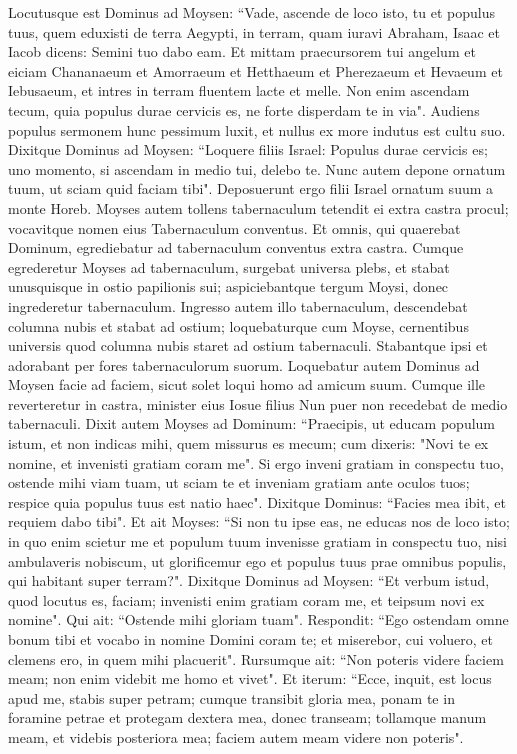 \begin{biblechapter}  
\verse Locutusque est Dominus ad Moysen: “Vade, ascende de loco isto, tu et populus tuus, quem eduxisti de terra Aegypti, in terram, quam iuravi Abraham, Isaac et Iacob dicens: Semini tuo dabo eam. 
\verse Et mittam praecursorem tui angelum et eiciam Chananaeum et Amorraeum et Hetthaeum et Pherezaeum et Hevaeum et Iebusaeum, 
\verse et intres in terram fluentem lacte et melle. Non enim ascendam tecum, quia populus durae cervicis es, ne forte disperdam te in via".  
\verse Audiens populus sermonem hunc pessimum luxit, et nullus ex more indutus est cultu suo. 
\verse Dixitque Dominus ad Moysen: “Loquere filiis Israel: Populus durae cervicis es; uno momento, si ascendam in medio tui, delebo te. Nunc autem depone ornatum tuum, ut sciam quid faciam tibi". 
\verse Deposuerunt ergo filii Israel ornatum suum a monte Horeb. 
\verse Moyses autem tollens tabernaculum tetendit ei extra castra procul; vocavitque nomen eius Tabernaculum conventus. Et omnis, qui quaerebat Dominum, egrediebatur ad tabernaculum conventus extra castra. 
\verse Cumque egrederetur Moyses ad tabernaculum, surgebat universa plebs, et stabat unusquisque in ostio papilionis sui; aspiciebantque tergum Moysi, donec ingrederetur tabernaculum. 
\verse Ingresso autem illo tabernaculum, descendebat columna nubis et stabat ad ostium; loquebaturque cum Moyse, 
\verse cernentibus universis quod columna nubis staret ad ostium tabernaculi. Stabantque ipsi et adorabant per fores tabernaculorum suorum. 
\verse Loquebatur autem Dominus ad Moysen facie ad faciem, sicut solet loqui homo ad amicum suum. Cumque ille reverteretur in castra, minister eius Iosue filius Nun puer non recedebat de medio tabernaculi. 
\verse Dixit autem Moyses ad Dominum: “Praecipis, ut educam populum istum, et non indicas mihi, quem missurus es mecum; cum dixeris: "Novi te ex nomine, et invenisti gratiam coram me". 
\verse Si ergo inveni gratiam in conspectu tuo, ostende mihi viam tuam, ut sciam te et inveniam gratiam ante oculos tuos; respice quia populus tuus est natio haec". 
\verse Dixitque Dominus: “Facies mea ibit, et requiem dabo tibi". 
\verse Et ait Moyses: “Si non tu ipse eas, ne educas nos de loco isto; 
\verse in quo enim scietur me et populum tuum invenisse gratiam in conspectu tuo, nisi ambulaveris nobiscum, ut glorificemur ego et populus tuus prae omnibus populis, qui habitant super terram?". 
\verse Dixitque Dominus ad Moysen: “Et verbum istud, quod locutus es, faciam; invenisti enim gratiam coram me, et teipsum novi ex nomine". 
\verse Qui ait: “Ostende mihi gloriam tuam". 
\verse Respondit: “Ego ostendam omne bonum tibi et vocabo in nomine Domini coram te; et miserebor, cui voluero, et clemens ero, in quem mihi placuerit". 
\verse Rursumque ait: “Non poteris videre faciem meam; non enim videbit me homo et vivet". 
\verse Et iterum: “Ecce, inquit, est locus apud me, stabis super petram; 
\verse cumque transibit gloria mea, ponam te in foramine petrae et protegam dextera mea, donec transeam; 
\verse tollamque manum meam, et videbis posteriora mea; faciem autem meam videre non poteris". 
\end{biblechapter}

